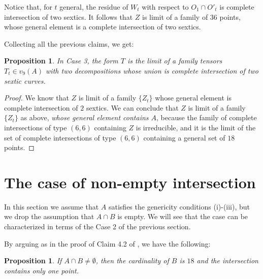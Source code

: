 \documentclass{amsart}
\newtheorem{prop0}[thm0]{Proposition}
\theoremstyle{definition}
\begin{document}
Notice that, for $t$ general, the residue of $W_t$ with respect to $O_1\cap O'_t$ is complete intersection of two sextics. It follows that $Z$ is limit of
a family of $36$ points, whose general element is a complete intersection of two sextics.

Collecting all the previous claims, we get:

\begin{prop0} In Case 3, the form $T$ is the limit of a family tensors $T_t\in v_9(A)$
with two decompositions whose union is complete intersection of two sextic curves.
\end{prop0}
\begin{proof} We know that $Z$ is limit of a family $\{Z_t\}$ whose general element is complete intersection of $2$ sextics.
We can conclude that  $Z$ is limit of a family $\{Z_t\}$ as above, \emph{whose general element contains $A$}, because the family
of complete intersections of type $(6,6)$ containing $Z$ is irreducible, and it is the limit of the set of complete intersections
of type $(6,6)$ containing a general set of $18$ points.
\end{proof}


\section{The case of non-empty intersection}\label{sec:intersection}

In this section we assume that $A$ satisfies the genericity conditions (i)-(iii), but we drop the assumption that $A\cap B$ is empty.
We will see that the case can be characterized in terms of the Case 2 of the previous section.

By arguing as in the proof of Claim 4.2 of \cite{AngeC}, we have the following:

\begin{prop0}\label{prop:cap1}
If $A\cap B\neq \emptyset$, then the cardinality of $B$ is $18$ and the intersection contains only one point.
\end{prop0}
\end{document}
